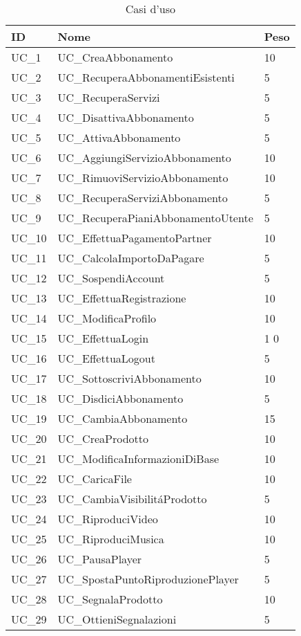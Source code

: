 \clearpage
\begin{longtable}{| p{} | p{} | p{} |} 
\caption{Casi d'uso}\\
\hline
\textbf{ID} & \textbf{Nome} & \textbf{Peso} \\\hline
UC\_1 & UC\_CreaAbbonamento & 10\\
UC\_2 & UC\_RecuperaAbbonamentiEsistenti & 5\\
UC\_3 & UC\_RecuperaServizi & 5\\
UC\_4 & UC\_DisattivaAbbonamento & 5\\
UC\_5 & UC\_AttivaAbbonamento & 5\\
UC\_6 & UC\_AggiungiServizioAbbonamento & 10\\
UC\_7 & UC\_RimuoviServizioAbbonamento & 10\\
UC\_8 & UC\_RecuperaServiziAbbonamento & 5\\
UC\_9 & UC\_RecuperaPianiAbbonamentoUtente & 5\\
UC\_10 & UC\_EffettuaPagamentoPartner & 10\\
UC\_11 & UC\_CalcolaImportoDaPagare & 5\\
UC\_12 & UC\_SospendiAccount & 5\\
UC\_13 & UC\_EffettuaRegistrazione & 10\\
UC\_14 & UC\_ModificaProfilo & 10\\
UC\_15 & UC\_EffettuaLogin &1 0\\
UC\_16 & UC\_EffettuaLogout & 5\\
UC\_17 & UC\_SottoscriviAbbonamento & 10\\
UC\_18 & UC\_DisdiciAbbonamento & 5\\
UC\_19 & UC\_CambiaAbbonamento & 15\\
UC\_20 & UC\_CreaProdotto & 10\\
UC\_21 & UC\_ModificaInformazioniDiBase & 10\\
UC\_22 & UC\_CaricaFile & 10\\
UC\_23 & UC\_CambiaVisibilit\'aProdotto & 5\\
UC\_24 & UC\_RiproduciVideo & 10\\
UC\_25 & UC\_RiproduciMusica & 10\\
UC\_26 & UC\_PausaPlayer & 5\\
UC\_27 & UC\_SpostaPuntoRiproduzionePlayer & 5\\
UC\_28 & UC\_SegnalaProdotto & 10\\
UC\_29 & UC\_OttieniSegnalazioni & 5\\

\end{longtable}
